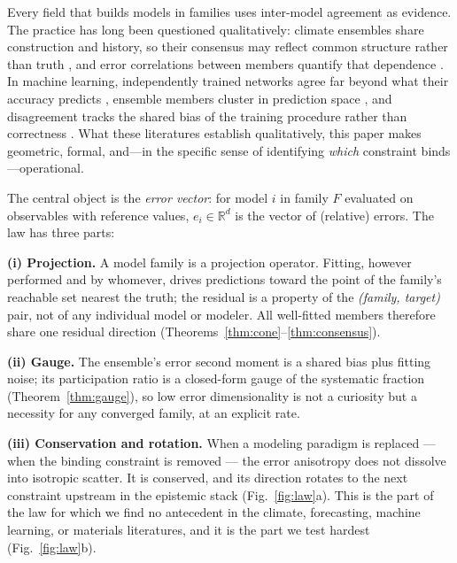\documentclass[11pt]{article}
\theoremstyle{remark}
\begin{document}
Every field that builds models in families uses inter-model agreement as
evidence. The practice has long been questioned qualitatively: climate
ensembles share construction and history, so their consensus may reflect
common structure rather than truth \citep{pirtle2010,parker2011}, and error
correlations between members quantify that dependence
\citep{bishop2013,annan2011,knutti2013}. In machine learning, independently
trained networks agree far beyond what their accuracy predicts
\citep{mania2019,geirhos2020}, ensemble members cluster in prediction space
\citep{fort2019}, and disagreement tracks the shared bias of the training
procedure rather than correctness \citep{jiang2021}. What these literatures
establish qualitatively, this paper makes geometric, formal, and---in the
specific sense of identifying \emph{which} constraint binds---operational.

The central object is the \emph{error vector}: for model $i$ in family $F$
evaluated on observables with reference values, $e_i \in \mathbb{R}^d$ is the
vector of (relative) errors. The law has three parts:

\textbf{(i) Projection.} A model family is a projection operator. Fitting,
however performed and by whomever, drives predictions toward the point of the
family's reachable set nearest the truth; the residual is a property of the
\emph{(family, target)} pair, not of any individual model or modeler. All
well-fitted members therefore share one residual direction
(Theorems~\ref{thm:cone}--\ref{thm:consensus}).

\textbf{(ii) Gauge.} The ensemble's error second moment is a shared bias plus
fitting noise; its participation ratio is a closed-form gauge of the
systematic fraction (Theorem~\ref{thm:gauge}), so low error dimensionality is
not a curiosity but a necessity for any converged family, at an explicit rate.

\textbf{(iii) Conservation and rotation.} When a modeling paradigm is
replaced --- when the binding constraint is removed --- the error anisotropy
does not dissolve into isotropic scatter. It is conserved, and its direction
rotates to the next constraint upstream in the epistemic stack
(Fig.~\ref{fig:law}a). This is the part of the law for which we find no
antecedent in the climate, forecasting, machine learning, or materials
literatures, and it is the part we test hardest (Fig.~\ref{fig:law}b).
\end{document}
